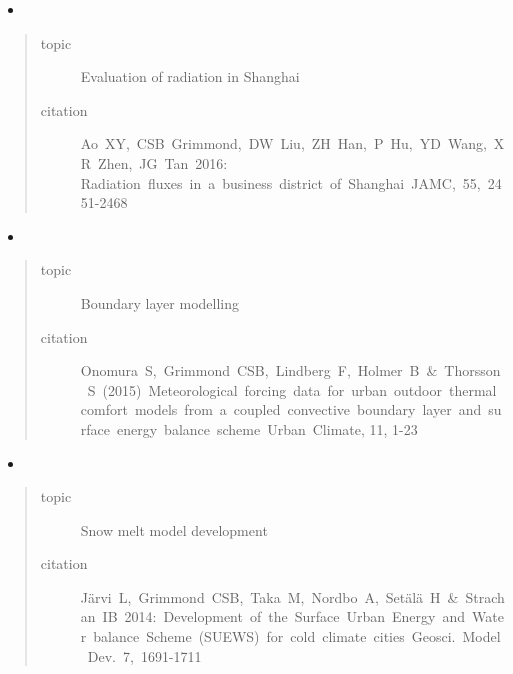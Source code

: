 \documentclass[letterpaper,10pt,english]{sphinxmanual}
\begin{document}
\begin{itemize}
\item {} 

\end{itemize}
\begin{quote}\begin{description}
\item[{topic}] \leavevmode
Evaluation of radiation in Shanghai

\item[{citation}] \leavevmode
Ao XY, CSB Grimmond, DW Liu, ZH Han, P Hu, YD Wang, XR Zhen, JG Tan 2016: Radiation fluxes in a business district of Shanghai JAMC, 55, 2451-2468

\end{description}\end{quote}
\begin{itemize}
\item {} 

\end{itemize}
\begin{quote}\begin{description}
\item[{topic}] \leavevmode
Boundary layer modelling

\item[{citation}] \leavevmode
Onomura S, Grimmond CSB, Lindberg F, Holmer B \& Thorsson S (2015) Meteorological forcing data for urban outdoor thermal comfort models from a coupled convective boundary layer and surface energy balance scheme Urban Climate, 11, 1-23

\end{description}\end{quote}
\begin{itemize}
\item {} 

\end{itemize}
\begin{quote}\begin{description}
\item[{topic}] \leavevmode
Snow melt model development

\item[{citation}] \leavevmode
Järvi L, Grimmond CSB, Taka M, Nordbo A, Setälä H \& Strachan IB 2014: Development of the Surface Urban Energy and Water balance Scheme (SUEWS) for cold climate cities Geosci. Model Dev. 7, 1691-1711

\end{description}\end{quote}
\end{document}
